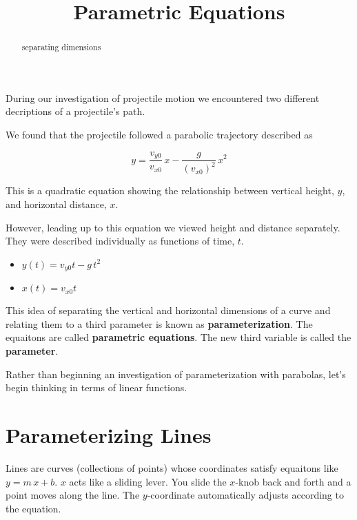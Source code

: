 \documentclass{ximera}
\title{Parametric Equations}
\begin{document}
\begin{abstract}
separating dimensions
\end{abstract}
\maketitle



During our investigation of projectile motion we encountered two different decriptions of a projectile's path.

We found that the projectile followed a parabolic trajectory described as 

\[  y = \frac{v_{y0}}{v_{x0}} \, x  - \frac{g}{(v_{x0})^2} \, x^2 \]

This is a quadratic equation showing the relationship between vertical height, $y$, and horizontal distance, $x$.  

However, leading up to this equation we viewed height and distance separately. They were described individually as functions of time, $t$.


\begin{itemize}
\item $y(t) = v_{y0} t - g \, t^2$


\item $x(t) = v_{x0} t$
\end{itemize}



This idea of separating the vertical and horizontal dimensions of a curve and relating them to a third parameter is known as \textbf{parameterization}.  The equaitons are called \textbf{parametric equations}.  The new third variable is called the \textbf{parameter}.



Rather than beginning an investigation of parameterization with parabolas, let's begin thinking in terms of linear functions.





\section{Parameterizing Lines}



Lines are curves (collections of points) whose coordinates satisfy equaitons like $y = m \, x + b$.  $x$ acts like a sliding lever.  You slide the $x$-knob back and forth and a point moves along the line.  The $y$-coordinate automatically adjusts according to the equation.
\end{document}
